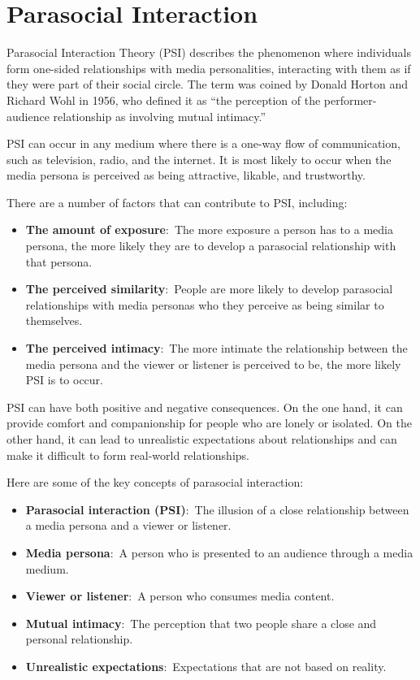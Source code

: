 \documentclass[
]{book}
\begin{document}
\section{Parasocial Interaction}\label{parasocial-interaction}

Parasocial Interaction Theory (PSI) describes the phenomenon where individuals form one-sided relationships with media personalities, interacting with them as if they were part of their social circle. The term was coined by Donald Horton and Richard Wohl in 1956, who defined it as ``the perception of the performer-audience relationship as involving mutual intimacy.''

PSI can occur in any medium where there is a one-way flow of communication, such as television, radio, and the internet. It is most likely to occur when the media persona is perceived as being attractive, likable, and trustworthy.

There are a number of factors that can contribute to PSI, including:

\begin{itemize}
\item
  \textbf{The amount of exposure}:~The more exposure a person has to a media persona, the more likely they are to develop a parasocial relationship with that persona.
\item
  \textbf{The perceived similarity}:~People are more likely to develop parasocial relationships with media personas who they perceive as being similar to themselves.
\item
  \textbf{The perceived intimacy}:~The more intimate the relationship between the media persona and the viewer or listener is perceived to be, the more likely PSI is to occur.
\end{itemize}

PSI can have both positive and negative consequences. On the one hand, it can provide comfort and companionship for people who are lonely or isolated. On the other hand, it can lead to unrealistic expectations about relationships and can make it difficult to form real-world relationships.

Here are some of the key concepts of parasocial interaction:

\begin{itemize}
\item
  \textbf{Parasocial interaction (PSI)}:~The illusion of a close relationship between a media persona and a viewer or listener.
\item
  \textbf{Media persona}:~A person who is presented to an audience through a media medium.
\item
  \textbf{Viewer or listener}:~A person who consumes media content.
\item
  \textbf{Mutual intimacy}:~The perception that two people share a close and personal relationship.
\item
  \textbf{Unrealistic expectations}:~Expectations that are not based on reality.
\end{itemize}
\end{document}
